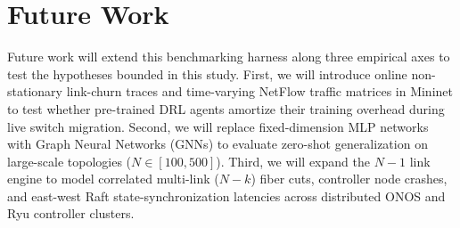 \documentclass[conference]{IEEEtran}
\begin{document}
\section{Future Work}
Future work will extend this benchmarking harness along three empirical axes to test the hypotheses bounded in this study. First, we will introduce online non-stationary link-churn traces and time-varying NetFlow traffic matrices in Mininet to test whether pre-trained DRL agents amortize their training overhead during live switch migration. Second, we will replace fixed-dimension MLP networks with Graph Neural Networks (GNNs) to evaluate zero-shot generalization on large-scale topologies ($N \in [100, 500]$). Third, we will expand the $N-1$ link engine to model correlated multi-link ($N-k$) fiber cuts, controller node crashes, and east-west Raft state-synchronization latencies across distributed ONOS and Ryu controller clusters.
\end{document}
